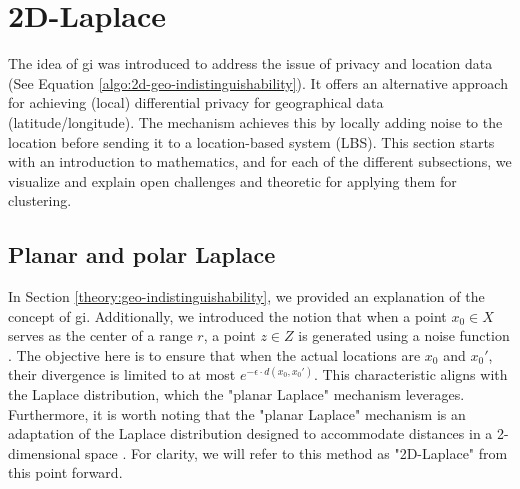 %

\newpage
\section{2D-Laplace}
The idea of \gls{gi} was introduced to address the issue of privacy and location data \citep{DBLP:journals/corr/abs-1212-1984} (See Equation \ref{algo:2d-geo-indistinguishability}).
It offers an alternative approach for achieving (local) differential privacy for geographical data (latitude/longitude).
The mechanism achieves this by locally adding noise to the location before sending it to a location-based system (LBS).
This section starts with an introduction to mathematics, and for each of the different subsections, we visualize and explain open challenges and theoretic for applying them for clustering.
\subsection{Planar and polar Laplace}
In Section \ref{theory:geo-indistinguishability}, we provided an explanation of the concept of \gls{gi}. 
Additionally, we introduced the notion that when a point $x_0 \in X$ serves as the center of a range $r$, a point $z \in Z$ is generated using a noise function \citep{DBLP:journals/corr/abs-1212-1984}. The objective here is to ensure that when the actual locations are $x_0$ and $x_0'$, their divergence is limited to at most $e^{-\epsilon \cdot d(x_0, x_0')}$. This characteristic aligns with the Laplace distribution, which the "planar Laplace" mechanism leverages.
Furthermore, it is worth noting that the "planar Laplace" mechanism is an adaptation of the Laplace distribution designed to accommodate distances in a 2-dimensional space \citep{DBLP:journals/corr/abs-1212-1984}. For clarity, we will refer to this method as "2D-Laplace" from this point forward.

